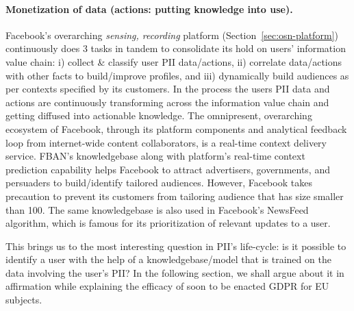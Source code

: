 \documentclass[runningheads]{llncs}
\begin{document}
\paragraph{Monetization of data (actions: putting knowledge into use).}
Facebook's overarching \textit{sensing, recording} platform
(Section~\ref{sec:osn-platform}) continuously does 3 tasks in tandem
to consolidate its hold on users' information value chain: i) collect
\& classify user PII data/actions, ii) correlate data/actions with
other facts to build/improve profiles, and iii) dynamically build
audiences as per contexts specified by its customers. In the process
the users PII data and actions are continuously transforming across
the information value chain and getting diffused into actionable
knowledge. The omnipresent, overarching ecosystem of Facebook, through
its platform components and analytical feedback loop from
internet-wide content collaborators, is a real-time context delivery
service. FBAN's knowledgebase along with platform's real-time context
prediction capability helps Facebook to attract advertisers,
governments, and persuaders to build/identify tailored
audiences. However, Facebook takes precaution to prevent its customers
from tailoring audience that has size smaller than 100. The same
knowledgebase is also used in Facebook's NewsFeed algorithm, which is
famous for its prioritization of relevant updates to a user.

This brings us to the most interesting question in PII's life-cycle:
is it possible to identify a user with the help of a
knowledgebase/model that is trained on the data involving the user's
PII? In the following section, we shall argue about it in affirmation
while explaining the efficacy of soon to be enacted GDPR for EU
subjects.



\end{document}
